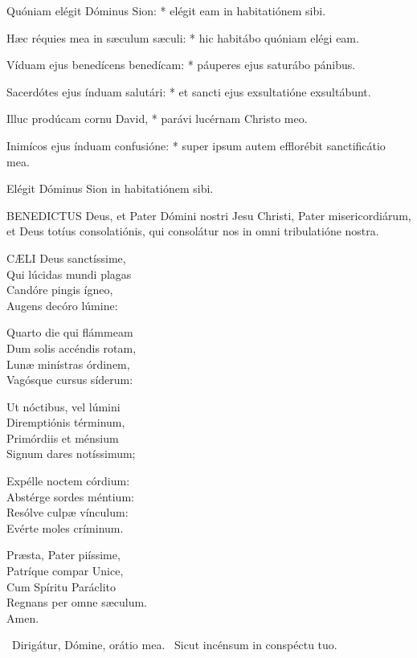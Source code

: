 Quóniam elégit Dóminus Sion: * elégit eam in habitatiónem sibi.

Hæc réquies mea in sæculum sæculi: * hic habitábo quóniam elégi eam.

Víduam ejus benedícens benedícam: * páuperes ejus saturábo pánibus.

Sacerdótes ejus índuam salutári: * et sancti ejus exsultatióne exsultábunt.

Illuc prodúcam cornu David, * parávi lucérnam Christo meo.

Inimícos ejus índuam confusióne: * super ipsum autem efflorébit sanctificátio mea.

 Elégit Dóminus Sion in habitatiónem sibi.



\lettrine[lines=2]{B}{ENEDICTUS} Deus, et Pater Dómini nostri Jesu Christi, Pater misericordiárum, et Deus totíus consolatiónis, qui consolátur nos in omni tribulatióne nostra.


\lettrine[lines=2]{C}{ÆLI} Deus sanctíssime,\\
Qui lúcidas mundi plagas\\
Candóre pingis ígneo,\\
Augens decóro lúmine:

Quarto die qui flámmeam\\
Dum solis accéndis rotam,\\
Lunæ minístras órdinem,\\
Vagósque cursus síderum:

Ut nóctibus, vel lúmini\\
Diremptiónis términum,\\
Primórdiis et ménsium\\
Signum dares notíssimum;

Expélle noctem córdium:\\
Abstérge sordes méntium:\\
Resólve culpæ vínculum:\\
Evérte moles críminum.

Præsta, Pater piíssime,\\
Patríque compar Unice,\\
Cum Spíritu Paráclito\\
Regnans per omne sæculum.\\
Amen.

\V\ Dirigátur, Dómine, orátio mea. \R\ Sicut incénsum in conspéctu tuo.

